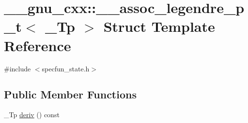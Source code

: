 \hypertarget{struct____gnu__cxx_1_1____assoc__legendre__p__t}{}\section{\+\_\+\+\_\+gnu\+\_\+cxx\+:\+:\+\_\+\+\_\+assoc\+\_\+legendre\+\_\+p\+\_\+t$<$ \+\_\+\+Tp $>$ Struct Template Reference}
\label{struct____gnu__cxx_1_1____assoc__legendre__p__t}


{\ttfamily \#include $<$specfun\+\_\+state.\+h$>$}

\subsection*{Public Member Functions}
\begin{DoxyCompactItemize}
\item 
\+\_\+\+Tp \hyperlink{struct____gnu__cxx_1_1____assoc__legendre__p__t_a6095c3389e149975f2a0ed7d21d84f2f}{deriv} () const
\end{DoxyCompactItemize}
